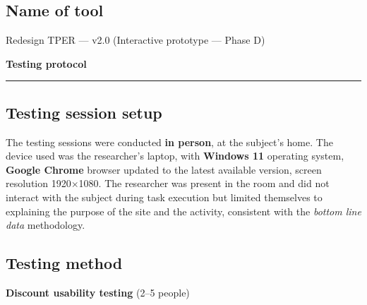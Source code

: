 ﻿\documentclass[11pt,a4paper]{article}
\begin{document}
\vspace{0.2cm}

\subsection*{Name of tool}
\begin{tcolorbox}[base]
Redesign TPER --- v2.0 (Interactive prototype --- Phase D)
\end{tcolorbox}

\vspace{0.2cm}

\begin{center}
  {\color{primaryColor}\large\bfseries Testing protocol}
  \vspace{0.1cm}
  \color{borderColor}\hrule
\end{center}

\vspace{0.2cm}

\subsection*{Testing session setup}
\begin{tcolorbox}[base]
The testing sessions were conducted \textbf{in person},
at the subject's home. The device used was
the researcher's laptop, with
\textbf{Windows 11} operating system, \textbf{Google Chrome} browser updated
to the latest available version, screen resolution 1920$\times$1080.
The researcher was present in the room and did not interact
with the subject during task execution but limited themselves
to explaining the purpose of the site and the activity, consistent
with the \textit{bottom line data} methodology.
\end{tcolorbox}

\vspace{0.2cm}

\subsection*{Testing method}
\textbf{Discount usability testing} (2--5 people)

\vspace{0.2cm}
\end{document}
